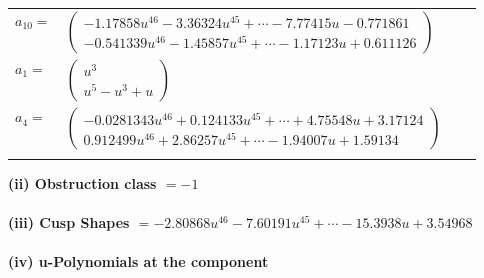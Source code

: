 \documentclass[1p]{elsarticle_modified}
\theoremstyle{definition}
\begin{document}
\begin{tabular}{m{7pt} m{180pt} m{7pt} m{180pt} }
\flushright $a_{10}=$&$\begin{pmatrix}-1.17858 u^{46}-3.36324 u^{45}+\cdots-7.77415 u-0.771861\\-0.541339 u^{46}-1.45857 u^{45}+\cdots-1.17123 u+0.611126\end{pmatrix}$ \\
\flushright $a_{1}=$&$\begin{pmatrix}u^3\\u^5- u^3+u\end{pmatrix}$ \\
\flushright $a_{4}=$&$\begin{pmatrix}-0.0281343 u^{46}+0.124133 u^{45}+\cdots+4.75548 u+3.17124\\0.912499 u^{46}+2.86257 u^{45}+\cdots-1.94007 u+1.59134\end{pmatrix}$\\&\end{tabular}
\flushleft \textbf{(ii) Obstruction class $= -1$}\\~\\
\flushleft \textbf{(iii) Cusp Shapes $= -2.80868 u^{46}-7.60191 u^{45}+\cdots-15.3938 u+3.54968$}\\~\\
\newpage\renewcommand{\arraystretch}{1}
\flushleft \textbf{(iv) u-Polynomials at the component}\newline \\
\end{document}
